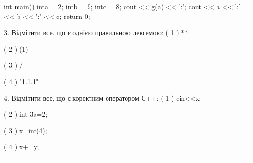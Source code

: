 \documentclass[11pt]{article}
\begin{document}
int main(){
    inta = 2;
    intb = 9;
    intc = 8;
    cout << g(a) << ':';
    cout << a << ':' << b << ':' << c;
    return 0; 
}

3. Відмітити все, що є однією правильною лексемою:
( 1 ) **

( 2 ) (1)

( 3 ) /

( 4 ) "1.1.1"

4. Відмітити все, що є коректним оператором С++:
( 1 ) cin<<x;

( 2 ) int 3a=2;

( 3 ) x=int(4);

( 4 ) x+=y;





\vspace{10mm}
\noindent\rule{\textwidth}{0.3pt}
\vspace{8mm}
\end{document}

